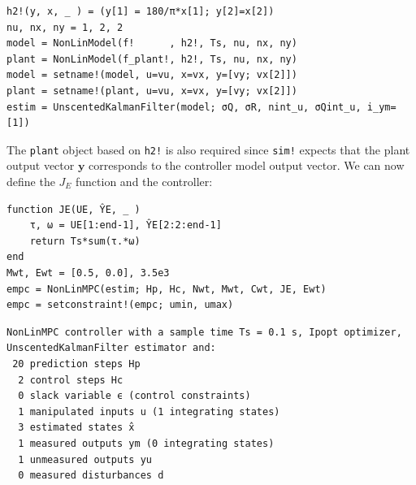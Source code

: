 \begin{verbatim}
h2!(y, x, _ ) = (y[1] = 180/π*x[1]; y[2]=x[2])
nu, nx, ny = 1, 2, 2
model = NonLinModel(f!      , h2!, Ts, nu, nx, ny)
plant = NonLinModel(f_plant!, h2!, Ts, nu, nx, ny)
model = setname!(model, u=vu, x=vx, y=[vy; vx[2]])
plant = setname!(plant, u=vu, x=vx, y=[vy; vx[2]])
estim = UnscentedKalmanFilter(model; σQ, σR, nint_u, σQint_u, i_ym=[1])
\end{verbatim}
The \texttt{plant} object based on \texttt{h2!} is also required since \texttt{sim!} expects that the plant output vector $\mathbf{y}$ corresponds to the controller model output vector. We can now define the $J_E$ function and the controller:
\begin{verbatim}
function JE(UE, ŶE, _ )
    τ, ω = UE[1:end-1], ŶE[2:2:end-1]
    return Ts*sum(τ.*ω)
end
Mwt, Ewt = [0.5, 0.0], 3.5e3
empc = NonLinMPC(estim; Hp, Hc, Nwt, Mwt, Cwt, JE, Ewt)
empc = setconstraint!(empc; umin, umax)
\end{verbatim}
\spacerepl
\begin{verbatim}
NonLinMPC controller with a sample time Ts = 0.1 s, Ipopt optimizer, UnscentedKalmanFilter estimator and:
 20 prediction steps Hp
  2 control steps Hc
  0 slack variable ϵ (control constraints)
  1 manipulated inputs u (1 integrating states)
  3 estimated states x̂
  1 measured outputs ym (0 integrating states)
  1 unmeasured outputs yu
  0 measured disturbances d
\end{verbatim}


